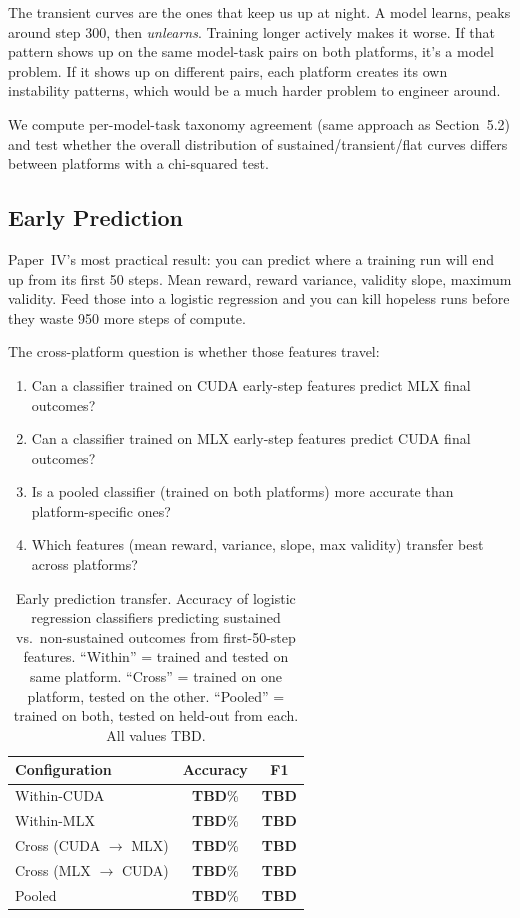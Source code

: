 \documentclass[11pt]{article}
\begin{document}
The transient curves are the ones that keep us up at night.  A model learns, peaks around step 300, then \emph{unlearns}.  Training longer actively makes it worse.  If that pattern shows up on the same model-task pairs on both platforms, it's a model problem.  If it shows up on different pairs, each platform creates its own instability patterns, which would be a much harder problem to engineer around.

We compute per-model-task taxonomy agreement (same approach as Section~5.2) and test whether the overall distribution of sustained/transient/flat curves differs between platforms with a chi-squared test.

\subsection{Early Prediction}
\label{sec:early-prediction}

Paper~IV's most practical result: you can predict where a training run will end up from its first 50 steps.  Mean reward, reward variance, validity slope, maximum validity.  Feed those into a logistic regression and you can kill hopeless runs before they waste 950 more steps of compute.

The cross-platform question is whether those features travel:

\begin{enumerate}[leftmargin=12pt]
    \item Can a classifier trained on CUDA early-step features predict MLX final outcomes?
    \item Can a classifier trained on MLX early-step features predict CUDA final outcomes?
    \item Is a pooled classifier (trained on both platforms) more accurate than platform-specific ones?
    \item Which features (mean reward, variance, slope, max validity) transfer best across platforms?
\end{enumerate}

\begin{table}[t]
\centering
\caption{Early prediction transfer.  Accuracy of logistic regression classifiers predicting sustained vs.\ non-sustained outcomes from first-50-step features. ``Within'' = trained and tested on same platform. ``Cross'' = trained on one platform, tested on the other. ``Pooled'' = trained on both, tested on held-out from each.  All values TBD.}
\label{tab:early-prediction}
\begin{tabular}{l cc}
\toprule
\textbf{Configuration} & \textbf{Accuracy} & \textbf{F1} \\
\midrule
Within-CUDA & \textbf{TBD}\% & \textbf{TBD} \\
Within-MLX & \textbf{TBD}\% & \textbf{TBD} \\
Cross (CUDA $\to$ MLX) & \textbf{TBD}\% & \textbf{TBD} \\
Cross (MLX $\to$ CUDA) & \textbf{TBD}\% & \textbf{TBD} \\
Pooled & \textbf{TBD}\% & \textbf{TBD} \\
\bottomrule
\end{tabular}
\end{table}
\end{document}

